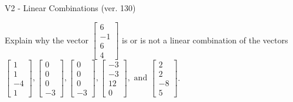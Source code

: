 \begin{exercise}
  \begin{exerciseTitle}V2 - Linear Combinations (ver. 130)\end{exerciseTitle}
  \begin{exerciseStatement}
    Explain why the vector \(\left[\begin{array}{c}
6 \\
-1 \\
6 \\
4
\end{array}\right]\)  is or is not a linear 
	combination of the vectors \(\left[\begin{array}{c}
1 \\
1 \\
-4 \\
1
\end{array}\right] , \left[\begin{array}{c}
0 \\
0 \\
0 \\
-3
\end{array}\right] , \left[\begin{array}{c}
0 \\
0 \\
0 \\
-3
\end{array}\right] , \left[\begin{array}{c}
-3 \\
-3 \\
12 \\
0
\end{array}\right] , \text{ and } \left[\begin{array}{c}
2 \\
2 \\
-8 \\
5
\end{array}\right]\).
	



\end{exerciseStatement}
\end{exercise}
